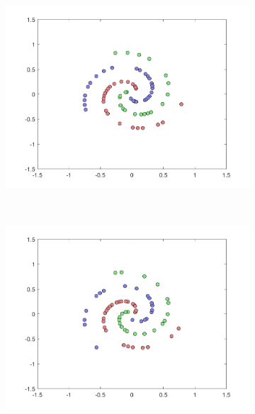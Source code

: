 \documentclass[a4paper, 10pt, conference]{ieeeconf}
\begin{document}
\begin{figure}[!ht]
  \captionsetup[subfigure]{position=b}
  \centering
    \begin{subfigure}{0.45\linewidth}
      \includegraphics[width=\textwidth]{img/bagged_1}
      \caption{}
    \end{subfigure}
    ~
    \begin{subfigure}{0.45\linewidth}
      \includegraphics[width=\textwidth]{img/bagged_2}
      \caption{}
    \end{subfigure}
	\\
    \begin{subfigure}{0.45\linewidth}

\end{subfigure}
\end{figure}
\end{document}

